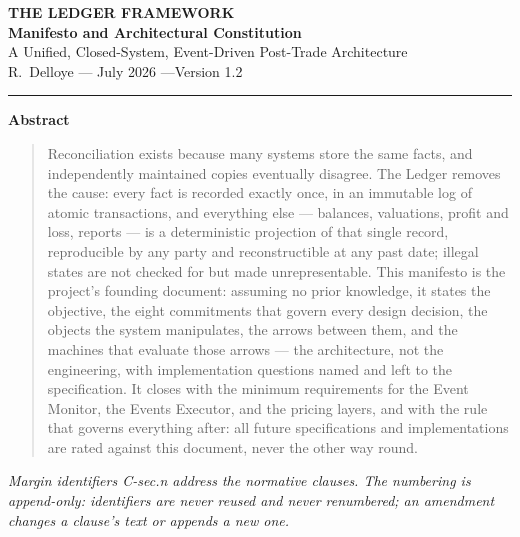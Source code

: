 \documentclass[11pt,a4paper]{article}
\begin{document}
\begin{center}
  {\LARGE\bfseries THE LEDGER FRAMEWORK}\\[0.9em]
  {\large\bfseries Manifesto and Architectural Constitution}\\[0.6em]
  {\normalsize A Unified, Closed-System, Event-Driven Post-Trade Architecture}\\[1.4em]
  R.~Delloye \quad--- July 2026 \quad---\quad Version 1.2
\end{center}

\vspace{0.6em}
\begin{center}\rule{0.35\linewidth}{0.4pt}\end{center}
\vspace{0.6em}

\begin{center}\textbf{Abstract}\end{center}
\begin{quote}
Reconciliation exists because many systems store the same facts, and
independently maintained copies eventually disagree. The Ledger removes
the cause: every fact is recorded exactly once, in an immutable log of
atomic transactions, and everything else --- balances, valuations,
profit and loss, reports --- is a deterministic projection of that
single record, reproducible by any party and reconstructible at any past
date; illegal states are not checked for but made unrepresentable. This
manifesto is the project's founding document: assuming no prior
knowledge, it states the objective, the eight commitments that govern every design
decision, the objects the system manipulates, the arrows
between them, and the machines that evaluate those arrows --- the
architecture, not the engineering, with implementation questions named
and left to the specification. It closes with the minimum requirements
for the Event Monitor, the Events Executor, and the pricing layers, and
with the rule that governs everything after: all future specifications
and implementations are rated against this document, never the other way
round.
\end{quote}

\begin{center}\small\itshape
Margin identifiers C-\emph{sec}.\emph{n} address the normative clauses.
The numbering is append-only: identifiers are never reused and never
renumbered; an amendment changes a clause's text or appends a new one.
\end{center}
\end{document}

